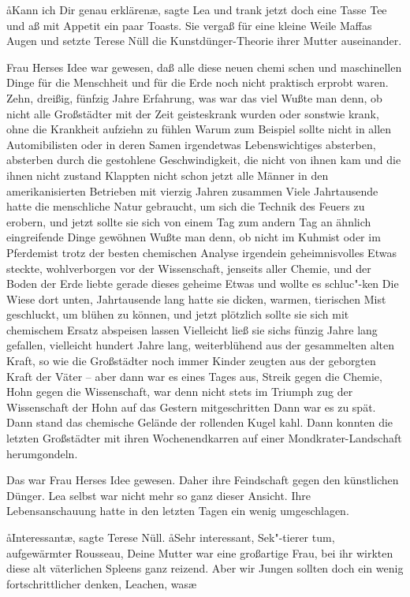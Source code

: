 \aa{}Kann ich Dir genau erklären\ae{}, sagte Lea und trank jetzt doch
eine Tasse Tee und aß mit Appetit ein paar Toasts. Sie
vergaß für eine kleine Weile Maffas Augen und setzte Terese
Nüll die Kunstdünger-Theorie ihrer Mutter auseinander.

Frau Herses Idee war gewesen, daß alle diese neuen chemi\-%
schen und maschinellen Dinge für die Menschheit und für die
Erde noch nicht praktisch erprobt waren. Zehn, dreißig, fünfzig
Jahre Erfahrung, was war das viel\frag{} Wußte man denn, ob
nicht alle Großstädter mit der Zeit geisteskrank wurden oder
sonstwie krank, ohne die Krankheit aufziehn zu fühlen\frag{}
Warum zum Beispiel sollte nicht in allen Automibilisten oder
in deren Samen irgendetwas Lebenswichtiges absterben,
absterben durch die gestohlene Geschwindigkeit, die nicht von
ihnen kam und die ihnen nicht zustand\frag{} Klappten nicht schon
jetzt alle Männer in den amerikanisierten Betrieben mit
vierzig Jahren zusammen\frag{} Viele Jahrtausende hatte die
menschliche Natur gebraucht, um sich die Technik des Feuers
zu erobern, und jetzt sollte sie sich von einem Tag zum andern
Tag an ähnlich eingreifende Dinge gewöhnen\frag{} Wußte man
denn, ob nicht im Kuhmist oder im Pferdemist trotz der besten
chemischen Analyse irgendein geheimnisvolles Etwas steckte,
wohlverborgen vor der Wissenschaft, jenseits aller Chemie,
und der Boden der Erde liebte gerade dieses geheime Etwas
und wollte es schluc"-ken\frag{} Die Wiese dort unten, Jahrtausende
lang hatte sie dicken, warmen, tierischen Mist geschluckt, um
blühen zu können, und jetzt plötzlich sollte sie sich mit chemischem
Ersatz abspeisen lassen\frag{} Vielleicht ließ sie sichs fünzig Jahre
lang gefallen, vielleicht hundert Jahre lang, weiterblühend
aus der gesammelten alten Kraft, so wie die Großstädter noch
immer Kinder zeugten aus der geborgten Kraft der Väter --
aber dann war es eines Tages aus, Streik gegen die Chemie,
Hohn gegen die Wissenschaft, war denn nicht stets im Triumph\-%
zug der Wissenschaft der Hohn auf das Gestern mitgeschritten\frag{}
Dann war es zu spät. Dann stand das chemische Gelände der
rollenden Kugel kahl. Dann konnten die letzten Großstädter
mit ihren Wochenendkarren auf einer Mondkrater-Landschaft
herumgondeln.

Das war Frau Herses Idee gewesen. Daher ihre Feindschaft
gegen den künstlichen Dünger. Lea selbst war nicht mehr so
ganz dieser Ansicht. Ihre Lebensanschauung hatte in den
letzten Tagen ein wenig umgeschlagen.

\aa{}Interessant\ae{}, sagte Terese Nüll. \aa{}Sehr interessant, Sek"-tierer\-%
tum, aufgewärmter Rousseau, Deine
Mutter war eine großartige Frau, bei ihr wirkten diese alt\-%
väterlichen Spleens ganz reizend. Aber wir Jungen sollten
doch ein wenig fortschrittlicher denken, Leachen, was\frag{}\ae{}

